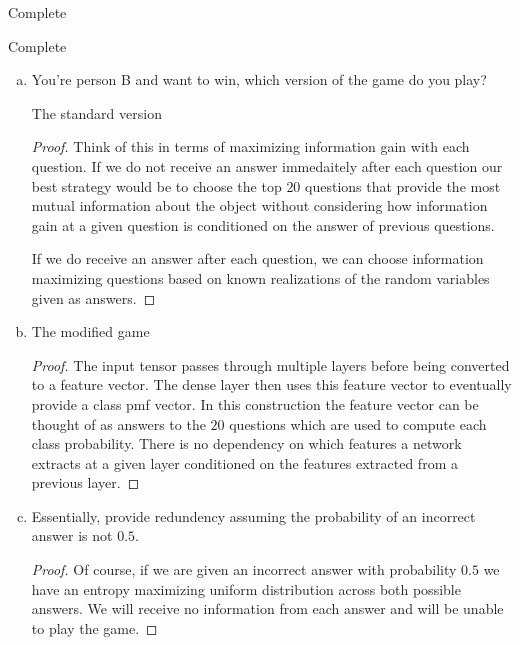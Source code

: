 \documentclass[11pt]{article}
\begin{document}
Complete

Complete

\noindent
\begin{enumerate}[(a)]\itemsep0pt
\item You're person B and want to win, which version of the game do you play?
	\begin{solution}
		The standard version
	\end{solution}

	\begin{proof}
		Think of this in terms of maximizing information gain with each
		question. If we do not receive an answer immedaitely after each
		question our best strategy would be to choose the top $20$ questions
		that provide the most mutual information about the object without
		considering how information gain at a given question is conditioned on
		the answer of previous questions.
		\newline

		If we do receive an answer after each question, we can choose
		information maximizing questions based on known realizations of the
		random variables given as answers.
	\end{proof}

\item
	\begin{solution}
		The modified game
	\end{solution}
	\begin{proof}
		The input tensor passes through multiple layers before being converted
		to a feature vector. The dense layer then uses this feature vector to
		eventually provide a class pmf vector. In this construction the feature
		vector can be thought of as answers to the $20$ questions which are
		used to compute each class probability. There is no dependency on which
		features a network extracts at a given layer conditioned on the
		features extracted from a previous layer.
	\end{proof}

\item
	\begin{solution}
		Essentially, provide redundency assuming the probability of an
		incorrect answer is not $0.5$.
	\end{solution}
	\begin{proof}
		Of course, if we are given an incorrect answer with probability $0.5$
		we have an entropy maximizing uniform distribution across both possible
		answers. We will receive no information from each answer and will be
		unable to play the game.
		\newline


\end{proof}
\end{enumerate}
\end{document}
